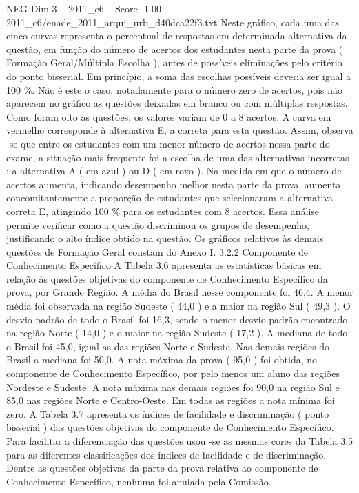 \begin{textsample}{NEG Dim 3 – 2011\_c6 – Score -1.00 – 2011\_c6/enade\_2011\_arqui\_urb\_d40dca22f3.txt}
Neste gráfico, cada uma das cinco curvas representa o percentual de respostas em determinada alternativa da questão, em função do número de acertos dos estudantes nesta parte da prova ( Formação Geral/Múltipla Escolha ), antes de possíveis eliminações pelo critério do ponto bisserial.
Em princípio, a soma das escolhas possíveis deveria ser igual a 100 \%.
Não é este o caso, notadamente para o número zero de acertos, pois não aparecem no gráfico as questões deixadas em branco ou com múltiplas respostas.
Como foram oito as questões, os valores variam de 0 a 8 acertos.
A curva em vermelho corresponde à alternativa E, a correta para esta questão.
Assim, observa -se que entre os estudantes com um menor número de acertos nessa parte do exame, a situação mais frequente foi a escolha de uma das alternativas incorretas : a alternativa A ( em azul ) ou D ( em roxo ).
Na medida em que o número de acertos aumenta, indicando desempenho melhor nesta parte da prova, aumenta concomitantemente a proporção de estudantes que selecionaram a alternativa correta E, atingindo 100 \% para os estudantes com 8 acertos.
Essa análise permite verificar como a questão discriminou os grupos de desempenho, justificando o alto índice obtido na questão.
Os gráficos relativos às demais questões de Formação Geral constam do Anexo I. 3.2.2 Componente de Conhecimento Específico A Tabela 3.6 apresenta as estatísticas básicas em relação às questões objetivas do componente de Conhecimento Específico da prova, por Grande Região.
A média do Brasil nesse componente foi 46,4.
A menor média foi observada na região Sudeste ( 44,0 ) e a maior na região Sul ( 49,3 ).
O desvio padrão de todo o Brasil foi 16,3, sendo o menor desvio padrão encontrado na região Norte ( 14,0 ) e o maior na região Sudeste ( 17,2 ).
A mediana de todo o Brasil foi 45,0, igual as das regiões Norte e Sudeste.
Nas demais regiões do Brasil a mediana foi 50,0.
A nota máxima da prova ( 95,0 ) foi obtida, no componente de Conhecimento Específico, por pelo menos um aluno das regiões Nordeste e Sudeste.
A nota máxima nas demais regiões foi 90,0 na região Sul e 85,0 nas regiões Norte e Centro-Oeste.
Em todas as regiões a nota mínima foi zero.
A Tabela 3.7 apresenta os índices de facilidade e discriminação ( ponto bisserial ) das questões objetivas do componente de Conhecimento Específico.
Para facilitar a diferenciação das questões usou -se as mesmas cores da Tabela 3.5 para as diferentes classificações dos índices de facilidade e de discriminação.
Dentre as questões objetivas da parte da prova relativa ao componente de Conhecimento Específico, nenhuma foi anulada pela Comissão.

\end{textsample}
